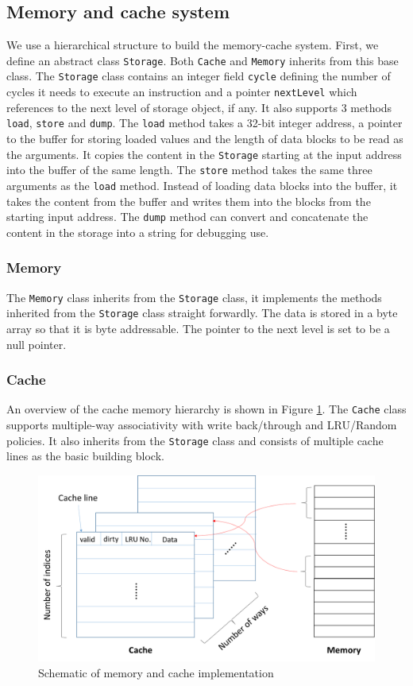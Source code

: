 \documentclass{sig-alternate}
\begin{document}
\subsection{Memory and cache system}
We use a hierarchical structure to build the memory-cache system. First, we define an abstract class \texttt{Storage}. Both \texttt{Cache} and \texttt{Memory} inherits from this base class. The \texttt{Storage} class contains an integer field \texttt{cycle} defining the number of cycles it needs to execute an instruction and a pointer \texttt{nextLevel} which references to the next level of storage object, if any. It also supports 3 methods \texttt{load}, \texttt{store} and \texttt{dump}. The \texttt{load} method takes a 32-bit integer address, a pointer to the buffer for storing loaded values and the length of data blocks to be read as the arguments. It copies the content in the \texttt{Storage} starting at the input address into the buffer of the same length. The \texttt{store} method takes the same three arguments as the \texttt{load} method. Instead of loading data blocks into the buffer, it takes the content from the buffer and writes them into the blocks from the starting input address. The \texttt{dump} method can convert and concatenate the content in the storage into a string for debugging use.  

\subsubsection{Memory}
The \texttt{Memory} class inherits from the \texttt{Storage} class, it implements the methods inherited from the \texttt{Storage} class straight forwardly. The data is stored in a byte array so that it is byte addressable. The pointer to the next level is set to be a null pointer. 

\subsubsection{Cache}
An overview of the cache memory hierarchy is shown in Figure \ref{fig:cache_vs_memory}. The \texttt{Cache} class supports multiple-way associativity with write back/through and LRU/Random policies. It also inherits from the \texttt{Storage} class and consists of multiple cache lines as the basic building block.

\begin{figure}[!ht]
\centering
\includegraphics[width = 0.7\linewidth,keepaspectratio]{Cache_and_Memory.png}
\caption{Schematic of memory and cache implementation}
\label{fig:cache_vs_memory}
\end{figure}
\end{document}
